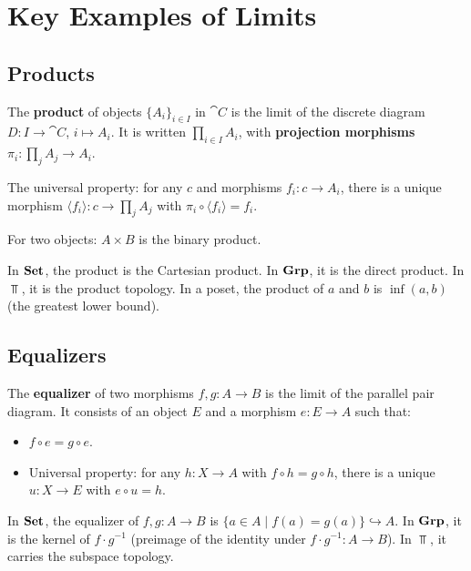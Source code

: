 \section{Key Examples of Limits}

\subsection{Products}

\begin{definition}[Product]
The \textbf{product} of objects $\{A_i\}_{i \in I}$ in $\cat{C}$ is the limit of the discrete diagram $D: I \to \cat{C}$, $i \mapsto A_i$. It is written $\prod_{i \in I} A_i$, with \textbf{projection morphisms} $\pi_i: \prod_j A_j \to A_i$.

The universal property: for any $c$ and morphisms $f_i: c \to A_i$, there is a unique morphism $\langle f_i \rangle: c \to \prod_j A_j$ with $\pi_i \circ \langle f_i \rangle = f_i$.

For two objects: $A \times B$ is the binary product.
\end{definition}

\begin{example}
In $\mathbf{Set}$, the product is the Cartesian product. In $\mathbf{Grp}$, it is the direct product. In $\Top$, it is the product topology. In a poset, the product of $a$ and $b$ is $\inf(a,b)$ (the greatest lower bound).
\end{example}

\subsection{Equalizers}

\begin{definition}[Equalizer]
The \textbf{equalizer} of two morphisms $f, g: A \to B$ is the limit of the parallel pair diagram. It consists of an object $E$ and a morphism $e: E \to A$ such that:
\begin{itemize}
  \item $f \circ e = g \circ e$.
  \item Universal property: for any $h: X \to A$ with $f \circ h = g \circ h$, there is a unique $u: X \to E$ with $e \circ u = h$.
\end{itemize}
\end{definition}

\begin{example}
In $\mathbf{Set}$, the equalizer of $f, g: A \to B$ is $\{a \in A \mid f(a) = g(a)\} \hookrightarrow A$. In $\mathbf{Grp}$, it is the kernel of $f \cdot g^{-1}$ (preimage of the identity under $f \cdot g^{-1}: A \to B$). In $\Top$, it carries the subspace topology.
\end{example}


